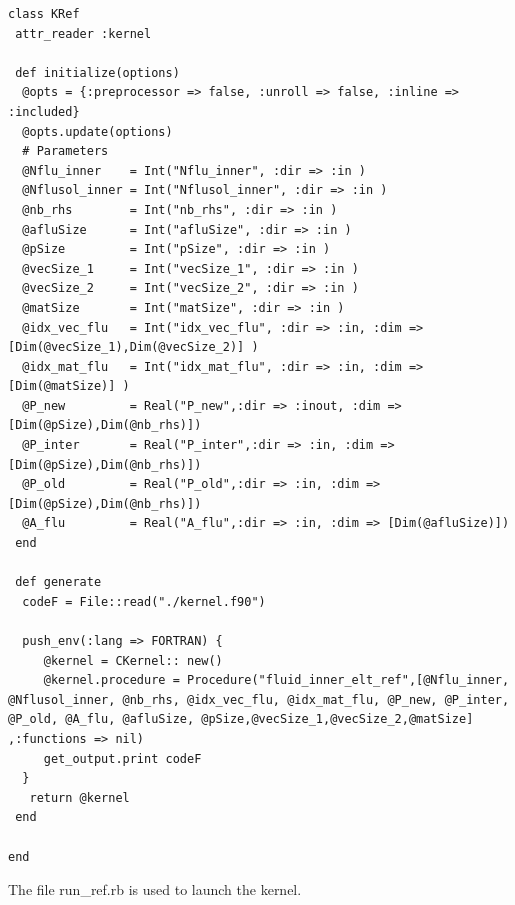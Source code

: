 \documentclass[10pt,twoside]{article}   	%
\begin{document}
\lstset{language=RUBY}
\begin{lstlisting}[caption=KRef.rb]
class KRef
 attr_reader :kernel

 def initialize(options)
  @opts = {:preprocessor => false, :unroll => false, :inline => :included}
  @opts.update(options)
  # Parameters 
  @Nflu_inner    = Int("Nflu_inner", :dir => :in )
  @Nflusol_inner = Int("Nflusol_inner", :dir => :in )
  @nb_rhs        = Int("nb_rhs", :dir => :in )
  @afluSize      = Int("afluSize", :dir => :in )
  @pSize         = Int("pSize", :dir => :in )
  @vecSize_1     = Int("vecSize_1", :dir => :in )
  @vecSize_2     = Int("vecSize_2", :dir => :in )
  @matSize       = Int("matSize", :dir => :in )
  @idx_vec_flu   = Int("idx_vec_flu", :dir => :in, :dim => [Dim(@vecSize_1),Dim(@vecSize_2)] )
  @idx_mat_flu   = Int("idx_mat_flu", :dir => :in, :dim => [Dim(@matSize)] )
  @P_new         = Real("P_new",:dir => :inout, :dim => [Dim(@pSize),Dim(@nb_rhs)])
  @P_inter       = Real("P_inter",:dir => :in, :dim => [Dim(@pSize),Dim(@nb_rhs)])
  @P_old         = Real("P_old",:dir => :in, :dim => [Dim(@pSize),Dim(@nb_rhs)])
  @A_flu         = Real("A_flu",:dir => :in, :dim => [Dim(@afluSize)])
 end

 def generate
  codeF = File::read("./kernel.f90")

  push_env(:lang => FORTRAN) {
     @kernel = CKernel:: new()
     @kernel.procedure = Procedure("fluid_inner_elt_ref",[@Nflu_inner, @Nflusol_inner, @nb_rhs, @idx_vec_flu, @idx_mat_flu, @P_new, @P_inter, @P_old, @A_flu, @afluSize, @pSize,@vecSize_1,@vecSize_2,@matSize] ,:functions => nil)
     get_output.print codeF
  }
   return @kernel
 end
 
end
\end{lstlisting}

The file run\_ref.rb is used to launch the kernel. 
\end{document}
